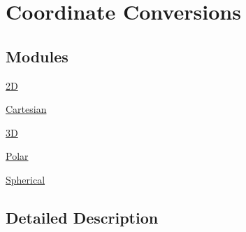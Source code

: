 \hypertarget{group___e_g_x_math-_conversions-_coordinate_conversions}{}\section{Coordinate Conversions}
\label{group___e_g_x_math-_conversions-_coordinate_conversions}
\subsection*{Modules}
\begin{DoxyCompactItemize}
\item 
\mbox{\hyperlink{group___e_g_x_math-_conversions-_coordinate_conversions-2_d}{2D}}
\item 
\mbox{\hyperlink{group___e_g_x_math-_conversions-_coordinate_conversions-_cartesian}{Cartesian}}
\item 
\mbox{\hyperlink{group___e_g_x_math-_conversions-_coordinate_conversions-3_d}{3D}}
\item 
\mbox{\hyperlink{group___e_g_x_math-_conversions-_coordinate_conversions-_polar}{Polar}}
\item 
\mbox{\hyperlink{group___e_g_x_math-_conversions-_coordinate_conversions-_spherical}{Spherical}}
\end{DoxyCompactItemize}


\subsection{Detailed Description}
